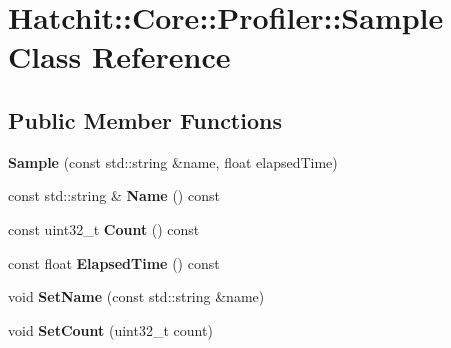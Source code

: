 \hypertarget{classHatchit_1_1Core_1_1Profiler_1_1Sample}{}\section{Hatchit\+:\+:Core\+:\+:Profiler\+:\+:Sample Class Reference}
\label{classHatchit_1_1Core_1_1Profiler_1_1Sample}
\subsection*{Public Member Functions}
\begin{DoxyCompactItemize}
\item 
{\bfseries Sample} (const std\+::string \&name, float elapsed\+Time)\hypertarget{classHatchit_1_1Core_1_1Profiler_1_1Sample_a3c80272e5292fa8ee0ba6e90554ab345}{}\label{classHatchit_1_1Core_1_1Profiler_1_1Sample_a3c80272e5292fa8ee0ba6e90554ab345}

\item 
const std\+::string \& {\bfseries Name} () const \hypertarget{classHatchit_1_1Core_1_1Profiler_1_1Sample_a710a121cbc0bbf8d4eb69ac4adb30f2c}{}\label{classHatchit_1_1Core_1_1Profiler_1_1Sample_a710a121cbc0bbf8d4eb69ac4adb30f2c}

\item 
const uint32\+\_\+t {\bfseries Count} () const \hypertarget{classHatchit_1_1Core_1_1Profiler_1_1Sample_a6cbf8edc2552fa40f274757c5fea032c}{}\label{classHatchit_1_1Core_1_1Profiler_1_1Sample_a6cbf8edc2552fa40f274757c5fea032c}

\item 
const float {\bfseries Elapsed\+Time} () const \hypertarget{classHatchit_1_1Core_1_1Profiler_1_1Sample_a9cd0c7b742fe350de1132601b86e8a16}{}\label{classHatchit_1_1Core_1_1Profiler_1_1Sample_a9cd0c7b742fe350de1132601b86e8a16}

\item 
void {\bfseries Set\+Name} (const std\+::string \&name)\hypertarget{classHatchit_1_1Core_1_1Profiler_1_1Sample_a591f8e3a9594e4334836b2eef8e00603}{}\label{classHatchit_1_1Core_1_1Profiler_1_1Sample_a591f8e3a9594e4334836b2eef8e00603}

\item 
void {\bfseries Set\+Count} (uint32\+\_\+t count)\hypertarget{classHatchit_1_1Core_1_1Profiler_1_1Sample_a2c3f58cfddabb2bf3d55f1abaee6b1f9}{}\label{classHatchit_1_1Core_1_1Profiler_1_1Sample_a2c3f58cfddabb2bf3d55f1abaee6b1f9}


\end{DoxyCompactItemize}

